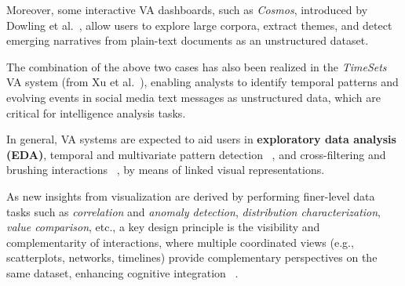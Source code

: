\documentclass{sfuthesis}
\begin{document}
Moreover, some interactive VA dashboards, such as \textit{Cosmos}, introduced by Dowling et al.~\cite{dowling_interactive_2019}, allow users to explore large corpora, extract themes, and detect emerging narratives from plain-text documents as an unstructured dataset.\par
The combination of the above two cases has also been realized in the \textit{TimeSets} VA system (from Xu et al.~\cite{xu_timesets_2020}), enabling analysts to identify temporal patterns and evolving events in social media text messages as unstructured data, which are critical for intelligence analysis tasks.\par
In general, VA systems are expected to aid users in \textbf{exploratory data analysis (EDA)}, temporal and multivariate pattern detection ~\cite{soriano2020tv}, and cross-filtering and brushing interactions ~\cite{roberts2007state}, by means of linked visual representations.\par
As new insights from visualization are derived by performing finer-level data tasks such as \textit{correlation} and \textit{anomaly detection}, \textit{distribution characterization}, \textit{value comparison}, etc., a key design principle is the visibility and complementarity of interactions, where multiple coordinated views (e.g., scatterplots, networks, timelines) provide complementary perspectives on the same dataset, enhancing cognitive integration ~\cite{sedig_supporting_2016}.
\end{document}
